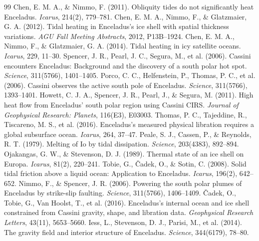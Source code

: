 \documentclass[11pt,a4paper]{article}
\begin{document}
\begin{thebibliography}{99}
 Chen, E. M. A., \& Nimmo, F. (2011). Obliquity tides do not significantly heat Enceladus. \textit{Icarus}, 214(2), 779--781.
 Chen, E. M. A., Nimmo, F., \& Glatzmaier, G. A. (2012). Tidal heating in Enceladus's ice shell with spatial thickness variations. \textit{AGU Fall Meeting Abstracts}, 2012, P13B--1924.
 Chen, E. M. A., Nimmo, F., \& Glatzmaier, G. A. (2014). Tidal heating in icy satellite oceans. \textit{Icarus}, 229, 11--30.
 Spencer, J. R., Pearl, J. C., Segura, M., et al. (2006). Cassini encounters Enceladus: Background and the discovery of a south polar hot spot. \textit{Science}, 311(5766), 1401--1405.
 Porco, C. C., Helfenstein, P., Thomas, P. C., et al. (2006). Cassini observes the active south pole of Enceladus. \textit{Science}, 311(5766), 1393--1401.
 Howett, C. J. A., Spencer, J. R., Pearl, J., \& Segura, M. (2011). High heat flow from Enceladus' south polar region using Cassini CIRS. \textit{Journal of Geophysical Research: Planets}, 116(E3), E03003.
 Thomas, P. C., Tajeddine, R., Tiscareno, M. S., et al. (2016). Enceladus's measured physical libration requires a global subsurface ocean. \textit{Icarus}, 264, 37--47.
 Peale, S. J., Cassen, P., \& Reynolds, R. T. (1979). Melting of Io by tidal dissipation. \textit{Science}, 203(4383), 892--894.
 Ojakangas, G. W., \& Stevenson, D. J. (1989). Thermal state of an ice shell on Europa. \textit{Icarus}, 81(2), 220--241.
 Tobie, G., Čadek, O., \& Sotin, C. (2008). Solid tidal friction above a liquid ocean: Application to Enceladus. \textit{Icarus}, 196(2), 642--652.
 Nimmo, F., \& Spencer, J. R. (2006). Powering the south polar plumes of Enceladus by strike-slip faulting. \textit{Science}, 311(5766), 1406--1409.
 Čadek, O., Tobie, G., Van Hoolst, T., et al. (2016). Enceladus's internal ocean and ice shell constrained from Cassini gravity, shape, and libration data. \textit{Geophysical Research Letters}, 43(11), 5653--5660.
 Iess, L., Stevenson, D. J., Parisi, M., et al. (2014). The gravity field and interior structure of Enceladus. \textit{Science}, 344(6179), 78--80.
\end{thebibliography}
\end{document}
